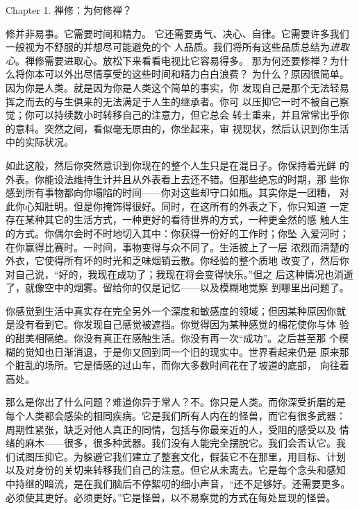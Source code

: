 


\beginchapter Chapter 1. 禅修：为何修禅？


{
\parindent=3pc
\noindent\hang{}
\1%
{修并非易事}。它需要时间和精力。
它还需要勇气、决心、自律。它需要许多我们一般视为不舒服的并想尽可能避免的个
人品质。我们将所有这些品质总结为{\it 进取心}。禅修需要进取心。放松下来看看电视比它容易得多。
那为何还要修禅？为什么将你本可以外出尽情享受的这些时间和精力白白浪费？
为什么？原因很简单。因为你是人类。就是因为你是人类这个简单的事实，你
发现自己是那个无法轻易挥之而去的与生俱来的无法满足于人生的继承者。你可
以压抑它一时不被自己察觉；你可以持续数小时转移自己的注意力，但它总会
转土重来，并且常常出乎你的意料。突然之间，看似毫无原由的，你坐起来，审
视现状，然后认识到你生活中的实际状况。

}

如此这般，然后你突然意识到你现在的整个人生只是在混日子。你保持着光鲜
的外表。你能设法维持生计并且从外表看上去还不错。但那些绝忘的时期，那
些你感到所有事物都向你塌陷的时间——你对这些却守口如瓶。其实你是一团糟，
对此你心知肚明。但是你掩饰得很好。同时，在这所有的外表之下，你只知道
一定存在某种其它的生活方式，一种更好的看待世界的方式，一种更全然的感
触人生的方式。你\1偶尔会时不时地切入其中：你获得一份好的工作时；你坠
入爱河时；在你赢得比赛时。一时间，事物变得与众不同了。生活披上了一层
浓烈而清楚的外衣，它使得所有坏的时光和乏味烟销云散。你经验的整个质地
改变了，然后你对自己说，“好的，我现在成功了；我现在将会变得快乐。”但之
后这种情况也消逝了，就像空中的烟雾。留给你的仅是记忆——以及模糊地觉察
到哪里出问题了。

你感觉到生活中真实存在完全另外一个深度和敏感度的领域；但因某种原因你就
是没有看到它。你发现自己感觉被遮挡。你觉得因为某种感觉的棉花使你与体
验的甜美相隔绝。你没有真正在感触生活。你没有再一次“成功”。之后甚至那
个模糊的觉知也日渐消退，于是你又回到同一个旧的现实中。世界看起来仍是
原来那个脏乱的场所。它是情感的过山车，而你大多数时间花在了坡道的底部，
向往着高处。

那么是你出了什么问题？难道你异于常人？不。你只是人类。而你深受折磨的是
每个人类都会感染的相同疾病。它是我们所有人内在的怪兽，而它有很多武器：
周期性紧张，缺乏对他人真正的同情，包括与你最亲近的人，受阻的感受以及
情绪的麻木——很多，很多种武器。我们没有人能完全摆脱它。我们会否认它。我
们试图压抑它。为躲避它我们建立了整套文化，假装它不在那里，用目标、计划
以及对身份的关切来转移我们自己的注意。但它从未离去。它是每个念头和感知
中持继的暗流，是在我们脑后不停絮叨的细小声音，“还不足够好。还需要更多。
必须使其更好。必须更好。”它是怪兽，以不易察觉的方式在每处显现的怪兽。

